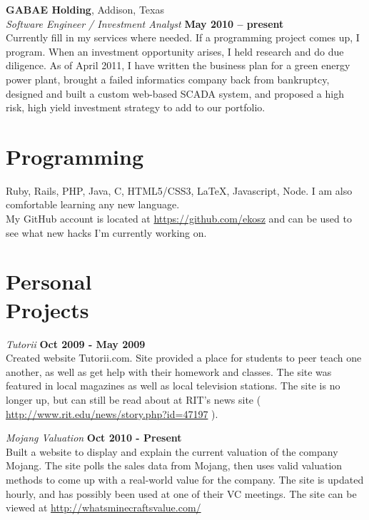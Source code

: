 \documentclass[margin,line]{resume}
\begin{document}
\begin{resume}
    \textbf{GABAE Holding}, Addison, Texas \vspace{2mm}\\\vspace{1mm}%
    \textsl{Software Engineer / Investment Analyst} \hfill \textbf{May 2010 -- present}\\
    Currently fill in my services where needed.  If a programming project comes up, I program.  
    When an investment opportunity arises, I held research and do due diligence. As of April 2011, I have
    written the business plan for a green energy power plant, brought a failed informatics company 
    back from bankruptcy, designed and built a custom web-based SCADA system, and proposed a
    high risk, high yield investment strategy to add to our portfolio.


    \section{\mysidestyle Programming} 

    Ruby, Rails, PHP, Java, C, HTML5/CSS3, \LaTeX, Javascript, Node. I am also comfortable learning any new language.\\
    My GitHub account is located at \url{https://github.com/ekosz} and can be used to see what new hacks
    I'm currently working on.


    \section{\mysidestyle Personal\\Projects} 

    \textsl{Tutorii} \hfill \textbf{Oct 2009 - May 2009}\\
    Created website Tutorii.com. Site provided a place for students to peer teach one another, 
    as well as get help with their homework and classes. The site was featured in local magazines 
    as well as local television stations. The site is no longer up, but can still be read about
    at RIT's news site ( \url{http://www.rit.edu/news/story.php?id=47197} ).


    \textsl{Mojang Valuation} \hfill \textbf{Oct 2010 - Present}\\
    Built a website to display and explain the current valuation of the company Mojang.  The site
    polls the sales data from Mojang, then uses valid valuation methods to come up with a real-world
    value for the company.  The site is updated hourly, and has possibly been used at one of their
    VC meetings. The site can be viewed at \url{http://whatsminecraftsvalue.com/}




\end{resume}
\end{document}
